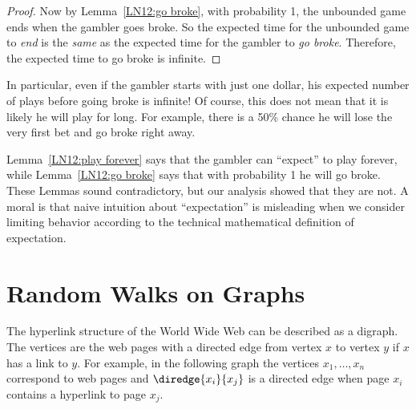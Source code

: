 \begin{example}
\begin{proof}
Now by Lemma~\ref{LN12:go broke}, with probability 1, the unbounded game ends
when the gambler goes broke.  So the expected time for the unbounded game
to \emph{end} is the \emph{same} as the expected time for the gambler to
\emph{go broke}.  Therefore, the expected time to go broke is infinite.
\end{proof}

In particular, even if the gambler starts with just one dollar, his
expected number of plays before going broke is infinite!  Of course, this
does not mean that it is likely he will play for long.  For example, there
is a 50\% chance he will lose the very first bet and go broke right away.

Lemma~\ref{LN12:play forever} says that the gambler can ``expect'' to play
forever, while Lemma~\ref{LN12:go broke} says that with probability 1 he will
go broke.  These Lemmas sound contradictory, but our analysis showed that
they are not.  A moral is that naive intuition about ``expectation'' is
misleading when we consider limiting behavior according to the technical
mathematical definition of expectation.
\fi


\begin{problems}
\homeworkproblems
{}
\end{problems}


\section{Random Walks on Graphs}\label{Google_sec}

The hyperlink structure of the World Wide Web can be described as a
digraph.  The vertices are the web pages with a directed edge from vertex
$x$ to vertex $y$ if $x$ has a link to $y$.  For example, in the following
graph the vertices $x_1, \ldots, x_n$ correspond to web pages and
$\diredge{x_i}{x_j}$ is a directed edge when page $x_i$ contains a
hyperlink to page $x_j$.



\end{example}

